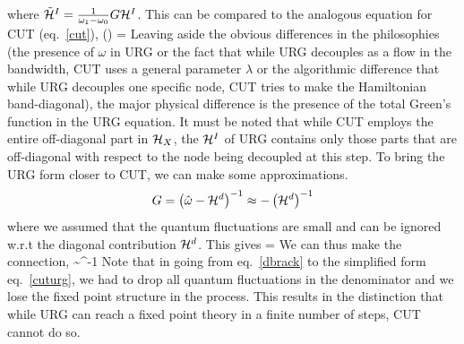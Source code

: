 \documentclass[12pt,twoside]{report}
\numberwithin{equation}{section}
\begin{document}
\eeq
where \(\tilde {\mathcal{H}}^I = \frac{1}{\omega_1 - \omega_0}G\mathcal{H}^I\). This can be compared to the analogous equation for CUT (eq.~\ref{cut}),
\beq
\Delta{\ham}(\lambda) = \Delta{\lambda}
\eeq
Leaving aside the obvious differences in the philosophies (the presence of \(\omega\) in URG or the fact that while URG decouples as a flow in the bandwidth, CUT uses a general parameter \(\lambda\) or the algorithmic difference that while URG decouples one specific node, CUT tries to make the Hamiltonian band-diagonal), the major physical difference is the presence of the total Green's function in the URG equation. It must be noted that while CUT employs the entire off-diagonal part in \(\mathcal{H}_X\), the \(\mathcal{H}^I\) of URG contains only those parts that are off-diagonal with respect to the node being decoupled at this step.
\pb To bring the URG form closer to CUT, we can make some approximations. 
\begin{equation}
G = \left(\hat \omega - \mathcal{H}^d\right)^{-1} \approx -\left(\mathcal{H}^d\right)^{-1}
\end{equation}
where we assumed that the quantum fluctuations are small and can be ignored w.r.t the diagonal contribution \(\mathcal{H}^d\). This gives
\beq[cuturg]
 =  
\eeq
We can thus make the connection,
\beq
\Delta \lambda \sim {}^{-1}
\eeq
Note that in going from eq.~\ref{dbrack} to the simplified form eq.~\ref{cuturg}, we had to drop all quantum fluctuations in the denominator and we lose the fixed point structure in the process. This results in the distinction that while URG can reach a fixed point theory in a finite number of steps, CUT cannot do so.
\end{document}
